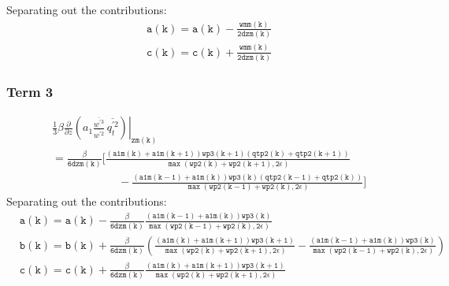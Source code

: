 \documentclass[11pt,fleqn]{article}
\newcommand{\ptlder}[2]{\frac{\partial #1}{\partial #2}}
\begin{document}
Separating out the contributions:
%
\begin{equation}
\begin{split}
& \mathtt{ a(k) = a(k) - \frac{wmm(k)}{2 dzm(k)} } \\
& \mathtt{ c(k) = c(k) + \frac{wmm(k)}{2 dzm(k)} }
\end{split}
\end{equation}

\subsubsection{Term 3}

\begin{equation}
\begin{split}
& \left.
  \frac{1}{3} \beta
   \ptlder{}{z}
     \left( 
       a_1
       \frac{\overline{w^{'3}}}{\overline{w^{'2}}} \,
       \overline{q_t^{'2}}
     \right)
   \right|_{\mathtt{zm(k)}} \\
&= \mathtt{
    \frac{\beta}{6 dzm(k)}
    \bigg[ \frac{\left(a1m(k)+a1m(k+1)\right) wp3(k+1) \left(qtp2(k)+qtp2(k+1) \right)}
                {\max\left(wp2(k)+wp2(k+1),2\epsilon\right)} } \\
&  \mathtt{ \quad \quad \quad \quad \quad \quad
          -\frac{\left(a1m(k-1)+a1m(k)\right) wp3(k) \left(qtp2(k-1)+qtp2(k) \right)}
                {\max\left(wp2(k-1)+wp2(k),2\epsilon\right)}
    \bigg]
    }
\end{split}
\end{equation}
%
Separating out the contributions:
%
\begin{equation}
\begin{split}
& \mathtt{ 
   a(k) = a(k) - \frac{\beta}{6 dzm(k)}
                 \frac{\left(a1m(k-1)+a1m(k)\right) wp3(k)}
                      {\max\left(wp2(k-1)+wp2(k),2\epsilon\right)}
  } \\
& \mathtt{
   b(k) = b(k) + \frac{\beta}{6 dzm(k)}
                 \left(
                   \frac{\left(a1m(k)+a1m(k+1)\right) wp3(k+1)}
                        {\max\left(wp2(k)+wp2(k+1),2\epsilon\right)}
                  -\frac{\left(a1m(k-1)+a1m(k)\right) wp3(k)}
                        {\max\left(wp2(k-1)+wp2(k),2\epsilon\right)}
                 \right)
  } \\
& \mathtt{
   c(k) = c(k) + \frac{\beta}{6 dzm(k)}
                 \frac{\left(a1m(k)+a1m(k+1)\right) wp3(k+1)}
                      {\max\left(wp2(k)+wp2(k+1),2\epsilon\right)}
  }
\end{split}
\end{equation}
 
\end{document}

